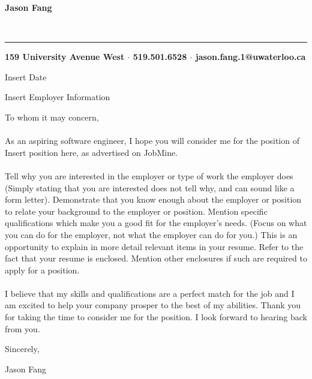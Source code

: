 \documentclass[12pt]{article}
\begin{document}
\pagestyle{empty}
\setlength{\parindent}{10cm}

\begin{center}
\begin{huge}\textbf{Jason Fang}\end{huge}\\
\rule{475pt}{1pt}
\textbf{159 University Avenue West $\cdot$ 519.501.6528 $\cdot$ jason.fang.1@uwaterloo.ca} 
\end{center}


\setlength{\parindent}{0pt}

\vspace{24pt}Insert Date 

Insert Employer Information

To whom it may concern,

\paragraph*{}As an aspiring software engineer, I hope you will consider me for the position of Insert position here, as advertised on JobMine.

\paragraph*{}Tell why you are interested in the employer or type of work the employer does (Simply stating that you are interested does not tell why, and can sound like a form letter). Demonstrate that you know enough about the employer or position to relate your background to the employer or position. Mention specific qualifications which make you a good fit for the employer’s needs. (Focus on what you can do for the employer, not what the employer can do for you.) This is an opportunity to explain in more detail relevant items in your resume. Refer to the fact that your resume is enclosed. Mention other enclosures if such are required to apply for a position.

\paragraph*{}\hspace{10pt}I believe that my skills and qualifications are a perfect match for the job and I am excited to help your company prosper to the best of my abilities. Thank you for taking the time to consider me for the position. I look forward to hearing back from you.

\vspace{12pt}Sincerely,

\vspace{12pt}Jason Fang
\end{document}
